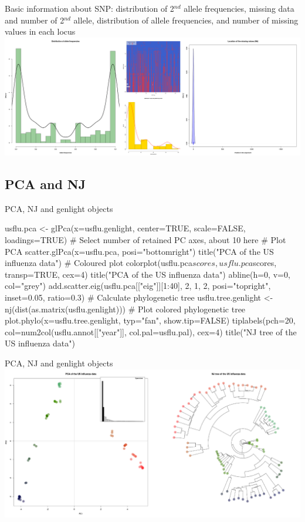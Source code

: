 \documentclass[compress, ucs, xelatex, 11pt, xcolor=svgnames,
  hyperref={
    bookmarks=true,
    unicode=true,
    colorlinks=true,
    pdftitle={Molecular data in R},
    plainpages=false,
    pdfauthor={Vojtech Zeisek},
    pdfsubject={Course about phylogeny and evolution in R},
    pdfcreator={XeLaTeX},
    pdfkeywords={R, evolution, phylogeny, molecular data},
    linkcolor=Tomato,
    anchorcolor=SaddleBrown,
    citecolor=Goldenrod,
    filecolor=DarkMagenta,
    menucolor=Sienna,
    urlcolor=DarkTurquoise,
    pdftex},
  url={hyphens, lowtilde} %
  ]{beamer}
\begin{document}
\begin{frame}{Basic information about SNP: distribution of 2$^{nd}$ allele frequencies, missing data and number of 2$^{nd}$ allele, distribution of allele frequencies, and number of missing values in each locus}
\includegraphics[width=\textwidth]{flu_alleles.png}
\end{frame}

\subsection{PCA and NJ}

\begin{frame}[fragile]{PCA, NJ and genlight objects}
  \begin{spluscode}
    usflu.pca <- glPca(x=usflu.genlight, center=TRUE, scale=FALSE,
      loadings=TRUE) # Select number of retained PC axes, about 10 here
    # Plot PCA
    scatter.glPca(x=usflu.pca, posi="bottomright")
    title("PCA of the US influenza data")
    # Coloured plot
    colorplot(usflu.pca$scores, usflu.pca$scores, transp=TRUE, cex=4)
    title("PCA of the US influenza data")
    abline(h=0, v=0, col="grey")
    add.scatter.eig(usflu.pca[["eig"]][1:40], 2, 1, 2, posi="topright",
      inset=0.05, ratio=0.3)
    # Calculate phylogenetic tree
    usflu.tree.genlight <- nj(dist(as.matrix(usflu.genlight)))
    # Plot colored phylogenetic tree
    plot.phylo(x=usflu.tree.genlight, typ="fan", show.tip=FALSE)
    tiplabels(pch=20, col=num2col(usflu.annot[["year"]],
      col.pal=usflu.pal), cex=4)
    title("NJ tree of the US influenza data")
  \end{spluscode}
\end{frame}

\begin{frame}{PCA, NJ and genlight objects}
\includegraphics[width=\textwidth]{flu_pcoa_nj.png}
\end{frame}
\end{document}
